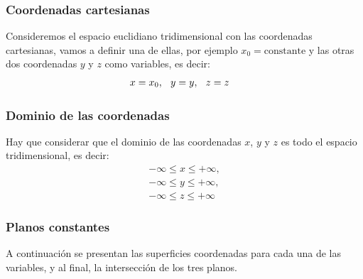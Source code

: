 \documentclass[12pt]{beamer}
\begin{document}
\begin{frame}
\frametitle{Coordenadas cartesianas}
Consideremos el espacio euclidiano tridimensional con las coordenadas cartesianas, \pause vamos a definir una de ellas, por ejemplo $x_{0} = \text{constante}$ y las otras dos coordenadas $y$ y $z$ como variables, es decir:
\pause
\begin{align*}
x &= x_{0}, \hspace{0.25cm} y = y, \hspace{0.25cm} z = z
\end{align*}
\end{frame}
\begin{frame}
\frametitle{Dominio de las coordenadas}
Hay que considerar que el dominio de las coordenadas $x$, $y$ y $z$ es todo el espacio tridimensional, es decir:
\pause
\begin{align*}
   -\infty \leq x \leq +\infty, \\[0.5em]
   -\infty \leq y \leq +\infty, \\[0.5em]
   -\infty \leq z \leq +\infty
\end{align*}
\end{frame}
\begin{frame}
\frametitle{Planos constantes}
A continuación se presentan las superficies coordenadas para cada una de las variables, y al final, la intersección de los tres planos.
\end{frame}
\end{document}

